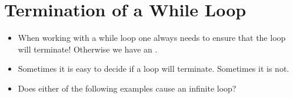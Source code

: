 \documentclass[letterpaper,10pt,english]{sphinxmanual}
\begin{document}
\section{Termination of a While Loop}
\label{\detokenize{lecture_notes/lec12_loops2_for_double:termination-of-a-while-loop}}\begin{itemize}
\item {} 
When working with a while loop one always needs to ensure that the
loop will terminate!  Otherwise we have an .

\item {} 
Sometimes it is easy to decide if a loop will terminate.  Sometimes
it is not.

\item {} 
Does either of the following examples cause an infinite loop?

\begin{sphinxVerbatim}[commandchars=\\\{\}]
 
  
   
      
     
\end{sphinxVerbatim}

\begin{sphinxVerbatim}[commandchars=\\\{\}]
 
  
   
      
     
\end{sphinxVerbatim}

\end{itemize}
\end{document}
